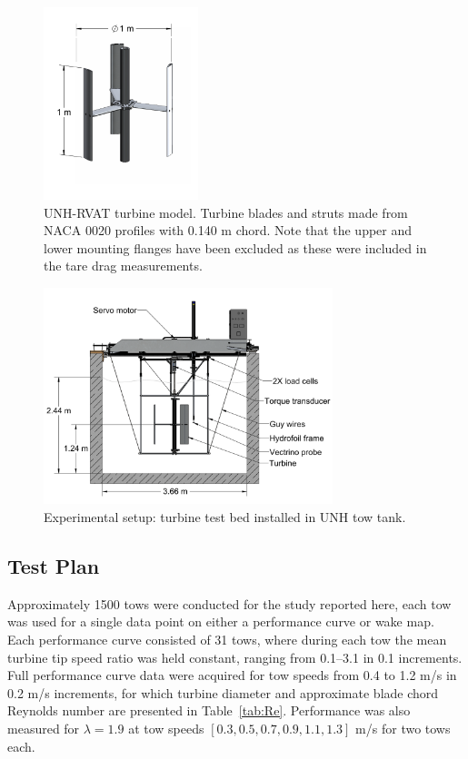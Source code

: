 \documentclass[energies,article,accept,moreauthors,pdftex,12pt,a4paper]{mdpi}
\begin{document}
\begin{figure}[ht!]
\centering
\includegraphics[width=0.4\textwidth]{figures/turbine}
\caption{UNH-RVAT turbine model. Turbine blades and struts made from NACA 0020 
profiles with 0.140 m chord. Note that the upper and lower mounting
flanges have been excluded as these were included in the tare drag
measurements.} 
\label{fig:turbine}
\end{figure}

\begin{figure}[ht!]
\centering
\includegraphics[width=0.75\textwidth]{figures/exp_setup_drawing}
\caption{Experimental setup: turbine test bed installed in UNH tow tank.}
\label{fig:exp-setup}
\end{figure}


\subsection{Test Plan} 

Approximately 1500 tows were conducted for the study reported here, each tow 
was used for a single data 
point on either a performance curve or wake map. 
Each performance curve consisted of 31
tows, where during each tow the mean turbine tip speed ratio was held constant,
ranging from 0.1--3.1 in 0.1 increments. Full performance curve data were
acquired for tow speeds from 0.4 to 1.2 m/s in 0.2 m/s increments, for which
turbine diameter and approximate blade chord Reynolds number are presented in
Table~\ref{tab:Re}. Performance was also measured for $\lambda=1.9$ at tow
speeds $[0.3, 0.5, 0.7, 0.9, 1.1, 1.3]$ m/s for two tows each.
\end{document}
